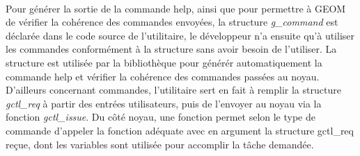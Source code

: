 \paragraph{}
Pour générer la sortie de la commande help, ainsi que pour permettre à GEOM de
vérifier la cohérence des commandes envoyées, la structure {\em g\_command} est
déclarée dans le code source de l'utilitaire, le développeur n'a ensuite qu'à 
utiliser les commandes conformément à la structure sans avoir besoin de
l'utiliser. La structure est utilisée par la bibliothèque pour générér
automatiquement la commande help et vérifier la cohérence des commandes passées
au noyau. D'ailleurs concernant commandes,
l'utilitaire sert en fait à remplir la structure {\em gctl\_req} à partir des
entrées utilisateurs, puis de l'envoyer au noyau via la fonction
{\em gctl\_issue}. Du côté noyau, une fonction permet selon le type de commande
d'appeler la fonction adéquate avec en argument la structure gctl\_req reçue,
dont les variables sont utilisée pour accomplir la tâche demandée.



